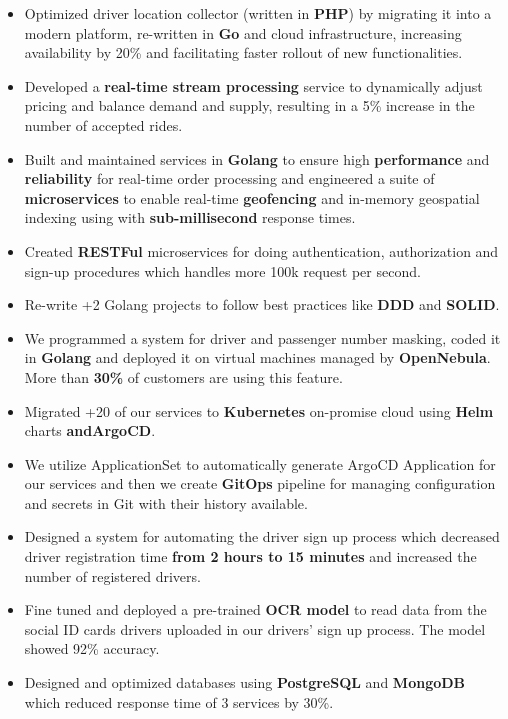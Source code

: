 \vspace{0.5cm}

\begin{itemize}
      \item Optimized driver location collector (written in \textbf{PHP}) by migrating it into a modern platform, re-written in \textbf{Go} and cloud infrastructure,
            increasing availability by 20\% and facilitating faster rollout of new functionalities.
      \item Developed a \textbf{real-time stream processing} service to dynamically adjust pricing and balance demand and supply,
            resulting in a 5\% increase in the number of accepted rides.
      \item Built and maintained services in \textbf{Golang} to ensure
            high \textbf{performance} and \textbf{reliability} for real-time order processing
            and engineered a suite of \textbf{microservices} to enable real-time \textbf{geofencing} and in-memory geospatial
            indexing using  with \textbf{sub-millisecond} response times.
      \item Created \textbf{RESTFul} microservices for doing authentication, authorization and sign-up procedures which handles more 100k request per second.
      \item Re-write +2 Golang projects to follow best practices like \textbf{DDD} and \textbf{SOLID}.
      \item We programmed a system for driver and passenger number masking, coded it in \textbf{Golang}
            and deployed it on virtual machines managed by \textbf{OpenNebula}. More than \textbf{30\%} of customers are using this feature.
      \item Migrated +20 of our services to \textbf{Kubernetes} on-promise cloud using \textbf{Helm} charts \textbf{andArgoCD}.
      \item We utilize  ApplicationSet to automatically generate ArgoCD Application
            for our services and then we create \textbf{GitOps} pipeline for managing configuration
            and secrets in Git with their history available.
      \item Designed a system for automating the driver sign up process which decreased driver registration time \textbf{from 2 hours to 15 minutes} and increased the number of registered drivers.
      \item Fine tuned and deployed a pre-trained \textbf{OCR model} to read data from the social ID cards drivers uploaded in our drivers' sign up process. The model showed 92\% accuracy.
      \item Designed and optimized databases using \textbf{PostgreSQL} and \textbf{MongoDB} which reduced response time of 3 services by 30\%.
\end{itemize}

